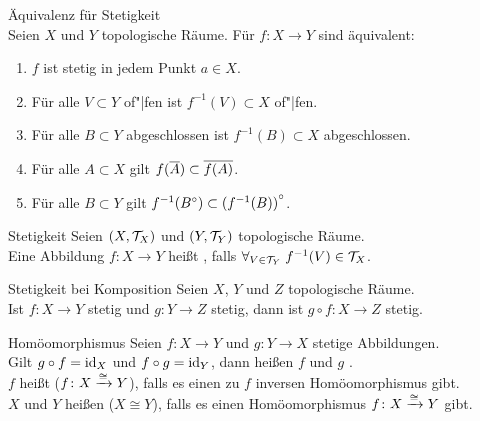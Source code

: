 \begin{Satz}{Äquivalenz für Stetigkeit} \\
    Seien $X$ und $Y$ topologische Räume.
    Für $f\colon X \rightarrow Y$ sind äquivalent:
    \begin{enumerate}
        \item
        $f$ ist stetig in jedem Punkt $a \in X$.
        
        \item
        Für alle $V \subset Y$ of"|fen ist $f^{-1}(V) \subset X$ of"|fen.
        
        \item
        Für alle $B \subset Y$ abgeschlossen ist $f^{-1}(B) \subset X$
        abgeschlossen.
        
        \item
        Für alle $A \subset X$ gilt
        $f(\overline{A}) \subset \overline{f(A)}$.
        
        \item
        Für alle $B \subset Y$ gilt
        $f^{-1}({B}^\circ) \subset {(f^{-1}(B))}^\circ$.
    \end{enumerate}
\end{Satz}

\begin{Def}{Stetigkeit}
    Seien $(X, \mathcal{T}_X)$ und $(Y, \mathcal{T}_Y)$ topologische Räume. \\
    Eine Abbildung $f\colon X \rightarrow Y$ heißt , falls
    $\forall_{V \in \mathcal{T}_Y}\; f^{-1}(V) \in \mathcal{T}_X$.
\end{Def}

\begin{Satz}{Stetigkeit bei Komposition}
    Seien $X$, $Y$ und $Z$ topologische Räume. \\
    Ist $f\colon X \rightarrow Y$ stetig und
    $g\colon Y \rightarrow Z$ stetig, dann ist
    $g \circ f\colon X \rightarrow Z$ stetig.
\end{Satz}

\linie
\pagebreak

\begin{Def}{Homöomorphismus}
    Seien $f\colon X \rightarrow Y$ und $g\colon Y \rightarrow X$ stetige
    Abbildungen. \\
    Gilt $g \circ f = \operatorname{id}_X$ und $f \circ g = \operatorname{id}_Y$, dann heißen $f$ und $g$
    . \\
    $f$ heißt  ($f\colon X \xrightarrow{\cong} Y$), falls es einen
    zu $f$ inversen Homöomorphismus gibt. \\
    $X$ und $Y$ heißen  ($X \cong Y$), falls
    es einen Homöomorphismus $f\colon X \xrightarrow{\cong} Y$ gibt.
\end{Def}

